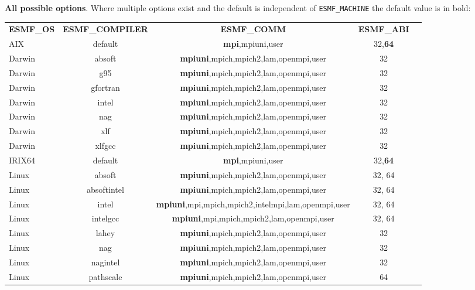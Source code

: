 \vspace{1ex}

{\bf All possible options}. Where multiple options exist 
and the default is independent of {\tt ESMF\_MACHINE} the default value is in bold:

\vspace{1ex}


\begin{tabular}{lcccc}
  {\bfseries ESMF\_OS} &{\bfseries ESMF\_COMPILER} & {\bfseries ESMF\_COMM} & {\bfseries ESMF\_ABI} \\

AIX     &  default      &  {\bf mpi},mpiuni,user         &  32,{\bf 64}  \\
Darwin  &  absoft       &  {\bf mpiuni},mpich,mpich2,lam,openmpi,user  &  32  \\
Darwin  &  g95          &  {\bf mpiuni},mpich,mpich2,lam,openmpi,user  &  32  \\
Darwin  &  gfortran     &  {\bf mpiuni},mpich,mpich2,lam,openmpi,user  &  32  \\
Darwin  &  intel        &  {\bf mpiuni},mpich,mpich2,lam,openmpi,user  &  32  \\
Darwin  &  nag          &  {\bf mpiuni},mpich,mpich2,lam,openmpi,user  &  32  \\
Darwin  &  xlf          &  {\bf mpiuni},mpich,mpich2,lam,openmpi,user  &  32  \\
Darwin  &  xlfgcc       &  {\bf mpiuni},mpich,mpich2,lam,openmpi,user  &  32  \\
IRIX64  &  default      &  {\bf mpi},mpiuni,user         &  32,{\bf 64}  \\
Linux   &  absoft       &  {\bf mpiuni},mpich,mpich2,lam,openmpi,user  &  32, 64  \\
Linux   &  absoftintel  &  {\bf mpiuni},mpich,mpich2,lam,openmpi,user  &  32, 64  \\
Linux   &  intel        &  {\bf mpiuni},mpi,mpich,mpich2,intelmpi,lam,openmpi,user  &  32, 64 \\
Linux   &  intelgcc     &  {\bf mpiuni},mpi,mpich,mpich2,lam,openmpi,user  &  32, 64 \\
Linux   &  lahey        &  {\bf mpiuni},mpich,mpich2,lam,openmpi,user  &  32  \\
Linux   &  nag          &  {\bf mpiuni},mpich,mpich2,lam,openmpi,user  &  32  \\
Linux   &  nagintel     &  {\bf mpiuni},mpich,mpich2,lam,openmpi,user  &  32  \\
Linux   &  pathscale    &  {\bf mpiuni},mpich,mpich2,lam,openmpi,user  &  64  \\

\end{tabular}
